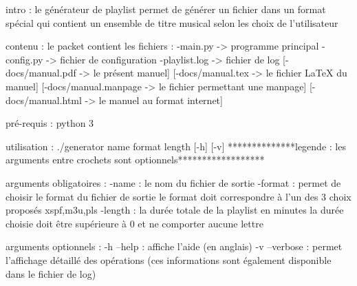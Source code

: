 \documentclass{article}
\begin{document}
intro :
le générateur de playlist permet de générer un fichier dans un format spécial qui contient un ensemble de titre musical selon les choix de l'utilisateur

contenu :
le packet contient les fichiers :
-main.py -> programme principal
-config.py -> fichier de configuration
-playlist.log -> fichier de log
[-docs/manual.pdf -> le présent manuel]
[-docs/manual.tex -> le fichier LaTeX du manuel]
[-docs/manual.manpage -> le fichier permettant une manpage]
[-docs/manual.html -> le manuel au format internet]

pré-requis :
python 3

utilisation :
./generator name format length [-h] [-v]
**************legende : les arguments entre crochets sont optionnels******************

arguments obligatoires :
-name : le nom du fichier de sortie
-format : permet de choisir le format du fichier de sortie
le format doit correspondre à l'un des 3 choix proposés {xspf,m3u,pls}
-length : la durée totale de la playlist en minutes
la durée choisie doit être supérieure à 0 et ne comporter aucune lettre

arguments optionnels :
-h --help : affiche l'aide (en anglais)
-v --verbose : permet l'affichage détaillé des opérations (ces informations sont également disponible dans le fichier de log)
\end{document}
